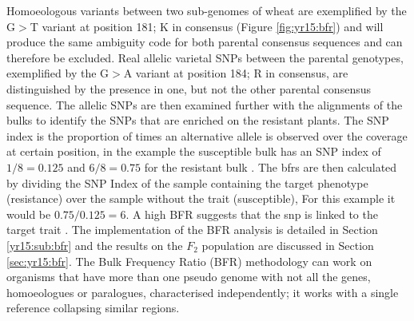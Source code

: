 Homoeologous variants between two sub-genomes of wheat are exemplified by the G$>$T variant at position 181; K in consensus (Figure \ref{fig:yr15:bfr}) and will produce the same ambiguity code for both parental consensus sequences and can therefore be excluded. 
Real allelic varietal SNPs between the parental genotypes, exemplified by the G$>$A variant at position 184; R in consensus, are distinguished by the presence in one, but not the other parental consensus sequence. 
The allelic SNPs are then examined further with the alignments of the bulks to identify the SNPs that are enriched on the resistant plants.
The SNP index is the proportion of times an alternative allele is observed over the coverage at certain position, in the example the susceptible bulk has an SNP index of $1/8=0.125$ and $6/8=0.75$ for the resistant bulk \citep{Takagi2013a}. 
The \glspl{bfr} are then calculated by dividing the SNP Index of the sample containing the target phenotype (resistance) over the sample without the trait (susceptible), For this example it would be $0.75/0.125=6$.  
A high BFR suggests that the \acrshort{snp} is linked to the target trait \citep{Trick2012}. 
The implementation of the BFR analysis is detailed in Section \ref{yr15:sub:bfr} and the results on the $F_2$ population are discussed in Section \ref{sec:yr15:bfr}. 
The Bulk Frequency Ratio (BFR) methodology
can work on organisms that have more than one pseudo genome
with not all the genes, homoeologues or paralogues, characterised independently;
it works with a single reference collapsing similar regions.

